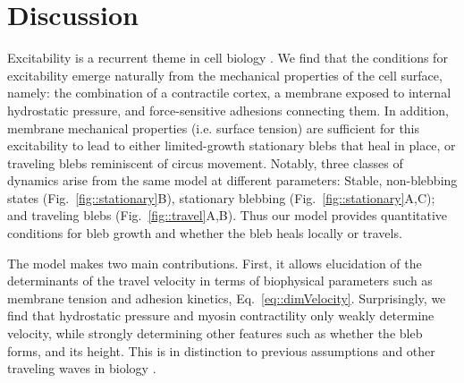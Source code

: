 

\section{Discussion}



Excitability is a recurrent theme in cell biology \cite{Huang:2013ge,Xiong:2010fb,FitzHugh:1961il, bement2015activator}. We find that the conditions for excitability emerge naturally from the mechanical properties of the cell surface, namely: the combination of a contractile cortex, a membrane exposed to internal hydrostatic pressure, and force-sensitive adhesions connecting them. In addition, membrane mechanical properties (i.e. surface tension) are sufficient for this excitability to lead to either limited-growth stationary blebs that heal in place, or traveling blebs reminiscent of circus movement. Notably, three classes of dynamics arise from the same model at different parameters: Stable, non-blebbing states (Fig.~\ref{fig::stationary}B), stationary blebbing (Fig.~\ref{fig::stationary}A,C); and traveling blebs (Fig.~\ref{fig::travel}A,B). Thus our model provides quantitative conditions for bleb growth and whether the bleb heals locally or travels. 

The model makes two main contributions. First, it allows elucidation of the determinants of the travel velocity in terms of biophysical parameters such as membrane tension and adhesion kinetics, Eq.~\ref{eq::dimVelocity}. Surprisingly, we find that hydrostatic pressure and myosin contractility only weakly determine velocity, while strongly determining other features such as whether the bleb forms, and its height. This is in distinction to previous assumptions \cite{Lim:2012fz} and other traveling waves in biology \cite{Allard:2012if}. 


